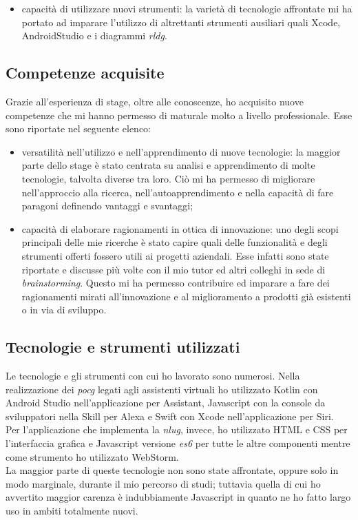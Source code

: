 \begin{itemize}
	\item capacità di utilizzare nuovi strumenti: la varietà di tecnologie affrontate mi ha portato ad imparare l'utilizzo di altrettanti strumenti ausiliari quali Xcode, AndroidStudio e i diagrammi \emph{\gls{rldg}}.
\end{itemize}
\subsection{Competenze acquisite}
Grazie all'esperienza di stage, oltre alle conoscenze, ho acquisito nuove competenze che mi hanno permesso di maturale molto a livello professionale. Esse sono riportate nel seguente elenco:
\begin{itemize}
	\item versatilità nell'utilizzo e nell'apprendimento di nuove tecnologie: la maggior parte dello stage è stato centrata su analisi e apprendimento di molte tecnologie, talvolta diverse tra loro. Ciò mi ha permesso di migliorare nell'approccio alla ricerca, nell'autoapprendimento e nella capacità di fare paragoni definendo vantaggi e svantaggi;
	\item capacità di elaborare ragionamenti in ottica di innovazione: uno degli scopi principali delle mie ricerche è stato capire quali delle funzionalità e degli strumenti offerti fossero utili ai progetti aziendali. Esse infatti sono state riportate e discusse più volte con il mio tutor ed altri colleghi in sede di \emph{\gls{brainstorming}}\glsfirstoccur. Questo mi ha permesso contribuire ed imparare a fare dei ragionamenti mirati all'innovazione e al miglioramento a prodotti già esistenti o in via di sviluppo.
\end{itemize}
\subsection{Tecnologie e strumenti utilizzati}
Le tecnologie e gli strumenti con cui ho lavorato sono numerosi. Nella realizzazione dei \emph{\gls{pocg}} legati agli assistenti virtuali ho utilizzato Kotlin con Android Studio nell'applicazione per Assistant, Javascript con la console da sviluppatori nella Skill per Alexa e Swift con Xcode nell'applicazione per Siri. \\
Per l'applicazione che implementa la \emph{\gls{nlug}}, invece, ho utilizzato HTML e CSS per l'interfaccia grafica e Javascript versione \emph{\gls{es6}} per tutte le altre componenti mentre come strumento ho utilizzato WebStorm. \\
La maggior parte di queste tecnologie non sono state affrontate, oppure solo in modo marginale, durante il mio percorso di studi; tuttavia quella di cui ho avvertito maggior carenza è indubbiamente Javascript in quanto ne ho fatto largo uso in ambiti totalmente nuovi.
